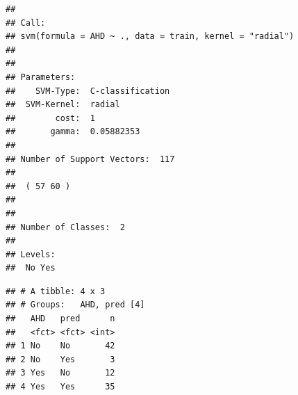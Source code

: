 \documentclass[]{article}
\newenvironment{Shaded}{\begin{snugshade}}{\end{snugshade}}
\newcommand{\DataTypeTok}[1]{\textcolor[rgb]{0.13,0.29,0.53}{#1}}
\newcommand{\KeywordTok}[1]{\textcolor[rgb]{0.13,0.29,0.53}{\textbf{#1}}}
\newcommand{\NormalTok}[1]{#1}
\newcommand{\OperatorTok}[1]{\textcolor[rgb]{0.81,0.36,0.00}{\textbf{#1}}}
\newcommand{\StringTok}[1]{\textcolor[rgb]{0.31,0.60,0.02}{#1}}
\begin{document}
\begin{Shaded}
\end{Shaded}

\begin{verbatim}
## 
## Call:
## svm(formula = AHD ~ ., data = train, kernel = "radial")
## 
## 
## Parameters:
##    SVM-Type:  C-classification 
##  SVM-Kernel:  radial 
##        cost:  1 
##       gamma:  0.05882353 
## 
## Number of Support Vectors:  117
## 
##  ( 57 60 )
## 
## 
## Number of Classes:  2 
## 
## Levels: 
##  No Yes
\end{verbatim}

\begin{Shaded}
\end{Shaded}

\begin{verbatim}
## # A tibble: 4 x 3
## # Groups:   AHD, pred [4]
##   AHD   pred      n
##   <fct> <fct> <int>
## 1 No    No       42
## 2 No    Yes       3
## 3 Yes   No       12
## 4 Yes   Yes      35
\end{verbatim}
\end{document}
